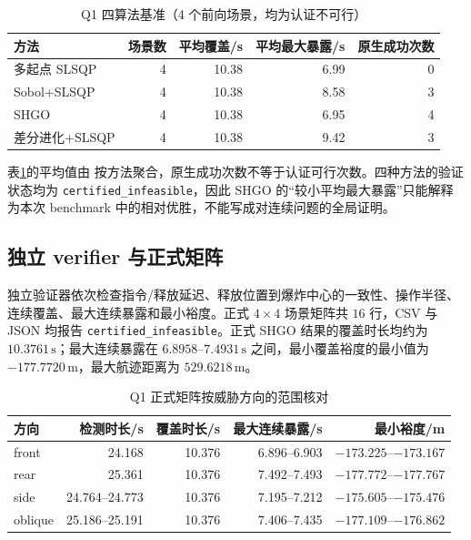 \begin{table}[!htbp]
\centering
\caption{Q1 四算法基准（4 个前向场景，均为认证不可行）}
\label{tab:q1-benchmark}
\begin{tabular}{lrrrr}
\toprule
方法 & 场景数 & 平均覆盖/s & 平均最大暴露/s & 原生成功次数 \\
\midrule
多起点 SLSQP & 4 & 10.38 & 6.99 & 0 \\
Sobol+SLSQP & 4 & 10.38 & 8.58 & 3 \\
SHGO & 4 & 10.38 & 6.95 & 4 \\
差分进化+SLSQP & 4 & 10.38 & 9.42 & 3 \\
\bottomrule
\end{tabular}
\end{table}

表\ref{tab:q1-benchmark}的平均值由  按方法聚合，原生成功次数不等于认证可行次数。四种方法的验证状态均为 \texttt{certified\_infeasible}，因此 SHGO 的“较小平均最大暴露”只能解释为本次 benchmark 中的相对优胜，不能写成对连续问题的全局证明。

\subsection{独立 verifier 与正式矩阵}

独立验证器依次检查指令/释放延迟、释放位置到爆炸中心的一致性、操作半径、连续覆盖、最大连续暴露和最小裕度。正式 $4\times4$ 场景矩阵共 $16$ 行，CSV 与 JSON 均报告 \texttt{certified\_infeasible}。正式 SHGO 结果的覆盖时长均约为 $10.3761\,\mathrm{s}$；最大连续暴露在 $6.8958$--$7.4931\,\mathrm{s}$ 之间，最小覆盖裕度的最小值为 $-177.7720\,\mathrm{m}$，最大航迹距离为 $529.6218\,\mathrm{m}$。

\begin{table}[!htbp]
\centering
\caption{Q1 正式矩阵按威胁方向的范围核对}
\label{tab:q1-direction}
\begin{tabular}{lrrrr}
\toprule
方向 & 检测时长/s & 覆盖时长/s & 最大连续暴露/s & 最小裕度/m \\
\midrule
front & 24.168 & 10.376 & 6.896--6.903 & $-173.225$--$-173.167$ \\
rear & 25.361 & 10.376 & 7.492--7.493 & $-177.772$--$-177.767$ \\
side & 24.764--24.773 & 10.376 & 7.195--7.212 & $-175.605$--$-175.476$ \\
oblique & 25.186--25.191 & 10.376 & 7.406--7.435 & $-177.109$--$-176.862$ \\
\bottomrule
\end{tabular}
\end{table}

